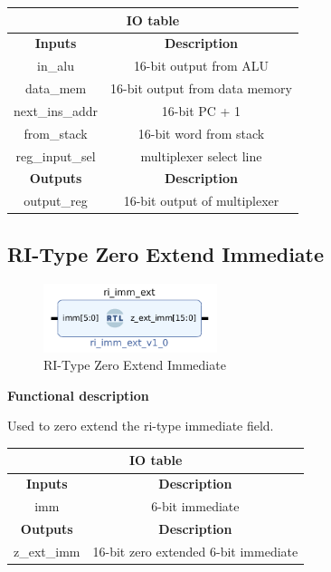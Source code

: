 \documentclass{article}
\begin{document}
\begin{par}
	\begin{center}
		\begin{tabular}{|c|c|}
			\hline 
			\multicolumn{2}{|c|}{\textbf{IO table}} \\
			\hline 
			\textbf{Inputs} & \textbf{Description} \\ 
			\hline 
			in\_alu & 16-bit output from ALU \\ 
			\hline 
			data\_mem & 16-bit output from data memory \\ 
			\hline 
			next\_ins\_addr & 16-bit PC + 1 \\ 
			\hline 
			from\_stack & 16-bit word from stack \\ 
			\hline 
			reg\_input\_sel & multiplexer select line \\ 
			\hline 
			\textbf{Outputs} & \textbf{Description} \\ 
			\hline 
			output\_reg & 16-bit output of multiplexer \\
			\hline
		\end{tabular}
	\end{center}

	\subsection{RI-Type Zero Extend Immediate}
	
	\begin{figure}[H]
		\centering
		\includegraphics[width=2in]{img/riImmExt.png}
		\caption{RI-Type Zero Extend Immediate}
	\end{figure}
	
	\textbf{Functional description}
	\begin{par}
		Used to zero extend the ri-type immediate field. 
	\end{par}
	
	\begin{center}
		\begin{tabular}{|c|c|}
			\hline 
			\multicolumn{2}{|c|}{\textbf{IO table}} \\
			\hline 
			\textbf{Inputs} & \textbf{Description} \\ 
			\hline 
			imm & 6-bit immediate \\ 
			\hline 
			\textbf{Outputs} & \textbf{Description} \\ 
			\hline 
			z\_ext\_imm & 16-bit zero extended 6-bit immediate \\
			\hline
		\end{tabular}
	\end{center}


\end{par}
\end{document}
